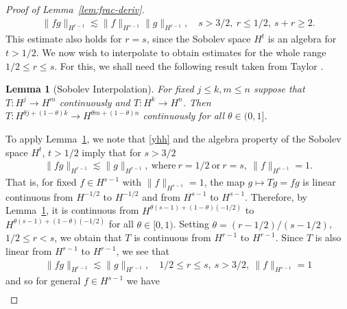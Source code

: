 \documentclass[12pt,reqno]{amsart}
\numberwithin{equation}{section}  %
\numberwithin{figure}{section}
\newtheorem{lemma}[theorem]{Lemma}
\begin{document}
\begin{proof}[Proof of Lemma~\ref{lem:frac-deriv}]
\begin{equation}
\begin{split}
\| f g \|_{H^{r-1}} \lesssim \| f \|_{H^{s-1}} \| g \|_{H^{r-1}},
\quad s > 3/2, \ r \le 1/2, \ s + r \ge 2.
\end{split}
\end{equation}
This estimate also holds for $r=s$, since the Sobolev space $H^{t}$ is an
algebra for $t > 1/2$. We now wish to interpolate to obtain estimates for the
whole range $1/2 \le r \le s$. For this, we shall need the following result taken from Taylor \cite{Taylor:1995kx}.
%
%
%
%
%                
%
%
%
%
\begin{lemma}[Sobolev Interpolation]
For fixed $j \le k, m \le n$ suppose that \\ $T: H^{j} \to H^{m}$ continuously
and $T: H^{k} \to H^{n}$. Then\\ $T: H^{\theta j + (1 - \theta)k} \to H^{\theta
m + (1 - \theta) n}$ continuously for all $\theta \in (0,1]$.
\label{prop:sob-interp}
\end{lemma}
%
To apply Lemma~\ref{prop:sob-interp}, we note that \eqref{yhh}
and the algebra property of the Sobolev space $H^{t}$, $t > 1/2$ imply that for $s > 3/2$
%
%
\begin{equation*}
\begin{split}
\| f g \|_{H^{r-1}} \lesssim \| g \|_{H^{r-1}}, \  \text{where} \ 
r=1/2 \ \text{or} \  r =s, \ \| f \|_{H^{s-1}} =1.
\end{split}
\end{equation*}
%
%
That is, for fixed $f \in H^{s-1}$ with $\| f \|_{H^{s-1}} =1$, the map $g \mapsto
Tg = fg$ is linear continuous from $H^{-1/2}$ to $H^{-1/2}$ and from $H^{s-1}$ to
$H^{s-1}$. Therefore, by Lemma~\ref{prop:sob-interp}, it is continuous from
$H^{\theta (s-1) + (1 - \theta)(-1/2) }$ to $H^{\theta (s-1) + (1 - \theta)(-1/2) }$ for all $\theta \in
[0, 1)$. Setting $\theta = (r-1/2)/(s-1/2)$, $ 1/2 \le r < s$, we obtain that $T$ is
continuous from $H^{r-1}$ to $H^{r-1}$. Since $T$ is also linear from $H^{r-1}$
to $H^{r-1}$, we see that 
%
%
\begin{equation*}
\begin{split}
\| f g \|_{H^{r-1}} \lesssim \| g \|_{H^{r-1}}, \quad 1/2 \le r \le s, \ s > 3/2, \ \| f \|_{H^{s-1}} =1
\end{split}
\end{equation*}
and so for general $f \in H^{s-1}$ we have 
%
\begin{equation}
\label{hhh}
\begin{split}

\end{split}
\end{equation}
\end{proof}
\end{document}
